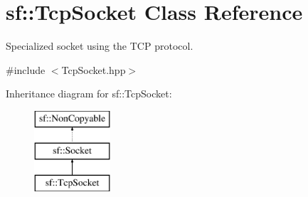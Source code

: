 \hypertarget{classsf_1_1TcpSocket}{\section{sf\-:\-:Tcp\-Socket Class Reference}
\label{classsf_1_1TcpSocket}
}


Specialized socket using the T\-C\-P protocol.  




{\ttfamily \#include $<$Tcp\-Socket.\-hpp$>$}

Inheritance diagram for sf\-:\-:Tcp\-Socket\-:\begin{figure}[H]
\begin{center}
\leavevmode
\includegraphics[height=3.000000cm]{classsf_1_1TcpSocket}
\end{center}
\end{figure}
